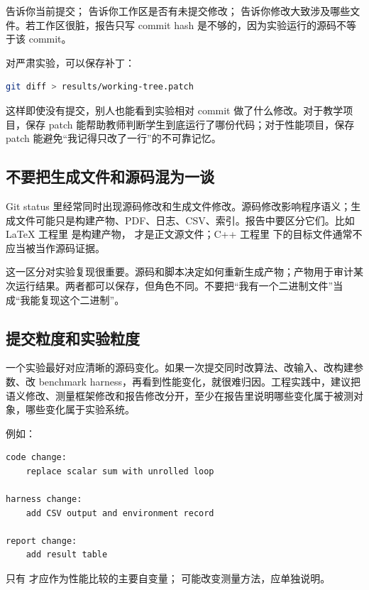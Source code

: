  告诉你当前提交； 告诉你工作区是否有未提交修改； 告诉你修改大致涉及哪些文件。若工作区很脏，报告只写 commit hash 是不够的，因为实验运行的源码不等于该 commit。

对严肃实验，可以保存补丁：

\begin{lstlisting}[language=bash]
git diff > results/working-tree.patch
\end{lstlisting}

这样即使没有提交，别人也能看到实验相对 commit 做了什么修改。对于教学项目，保存 patch 能帮助教师判断学生到底运行了哪份代码；对于性能项目，保存 patch 能避免“我记得只改了一行”的不可靠记忆。

\subsection{不要把生成文件和源码混为一谈}

Git status 里经常同时出现源码修改和生成文件修改。源码修改影响程序语义；生成文件可能只是构建产物、PDF、日志、CSV、索引。报告中要区分它们。比如 LaTeX 工程里  是构建产物， 才是正文源文件；C++ 工程里  下的目标文件通常不应当被当作源码证据。

这一区分对实验复现很重要。源码和脚本决定如何重新生成产物；产物用于审计某次运行结果。两者都可以保存，但角色不同。不要把“我有一个二进制文件”当成“我能复现这个二进制”。

\subsection{提交粒度和实验粒度}

一个实验最好对应清晰的源码变化。如果一次提交同时改算法、改输入、改构建参数、改 benchmark harness，再看到性能变化，就很难归因。工程实践中，建议把语义修改、测量框架修改和报告修改分开，至少在报告里说明哪些变化属于被测对象，哪些变化属于实验系统。

例如：

\begin{lstlisting}
code change:
    replace scalar sum with unrolled loop

harness change:
    add CSV output and environment record

report change:
    add result table
\end{lstlisting}

只有  才应作为性能比较的主要自变量； 可能改变测量方法，应单独说明。

